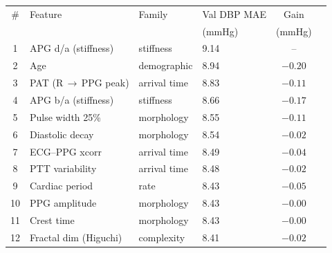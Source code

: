 \documentclass[border=8pt]{standalone}
\begin{document}
\begin{tabular}{clllcc}
\toprule
\# & Feature & Family & Val DBP MAE & Gain \\
   &         &        & (mmHg)      & (mmHg) \\
\midrule
\rowcolor{hl} 1 & APG d/a (stiffness)   & stiffness    & 9.14 & -- \\
\rowcolor{hl} 2 & Age                   & demographic  & 8.94 & $-0.20$ \\
\rowcolor{hl} 3 & PAT (R\,$\to$\,PPG peak) & arrival time & 8.83 & $-0.11$ \\
\rowcolor{hl} 4 & APG b/a (stiffness)   & stiffness    & 8.66 & $-0.17$ \\
\rowcolor{hl} 5 & Pulse width 25\%      & morphology   & 8.55 & $-0.11$ \\
6  & Diastolic decay       & morphology   & 8.54 & $-0.02$ \\
7  & ECG--PPG xcorr        & arrival time & 8.49 & $-0.04$ \\
8  & PTT variability       & arrival time & 8.48 & $-0.02$ \\
9  & Cardiac period        & rate         & 8.43 & $-0.05$ \\
10 & PPG amplitude         & morphology   & 8.43 & $-0.00$ \\
11 & Crest time            & morphology   & 8.43 & $-0.00$ \\
12 & Fractal dim (Higuchi) & complexity   & 8.41 & $-0.02$ \\
\bottomrule
\end{tabular}
\end{document}

